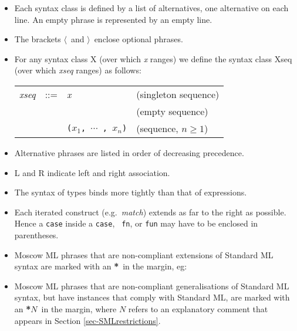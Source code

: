 \documentclass[fleqn]{article}
\newcommand{\x}[1][]{{\bf{*}#1}}
\newcommand{\la}{$\langle$}
\newcommand{\ra}{$\rangle$}
\begin{document}
\begin{itemize}
\item Each syntax class is defined by a list of alternatives, one
  alternative on each line.  An empty phrase is represented by an
  empty line.

\item The brackets \la\ and \ra\ enclose optional phrases.

\item For any syntax class X (over which {\it x\/} ranges) we define the syntax
  class Xseq (over which {\it xseq\/} ranges) as follows:

  \begin{center}
    \begin{tabular}{llll}
      {\it xseq\/} &  ::=  & {\it x\/} & (singleton sequence)\\
             &       &           & (empty sequence)\\
             &       & {\tt ($x_1$, $\cdots$ , $x_n$)} & (sequence,
             $n\geq 1$)
    \end{tabular}
  \end{center}
\item Alternative phrases are listed in order of decreasing precedence.

\item L and R indicate left and right association.

\item The syntax of types binds more tightly than that of expressions.

\item Each iterated construct (e.g.\ {\it match\/}) extends as far to
  the right as possible.  Hence a {\tt case} inside a {\tt case}, {\tt
    fn}, or {\tt fun} may have to be enclosed in parentheses.

\item Moscow ML phrases that are non-compliant 
      extensions of Standard ML syntax are
      marked with an \x\ in the margin, eg:

\item Moscow ML phrases that are non-compliant 
      generalisations of Standard ML syntax,
      but have instances that comply with Standard ML, are 
      marked with an \x[$N$]\ in the margin, where
      $N$ refers to an explanatory comment that appears in
      Section \ref{sec-SMLrestrictions}.
\end{itemize}

\newpage
\end{document}

